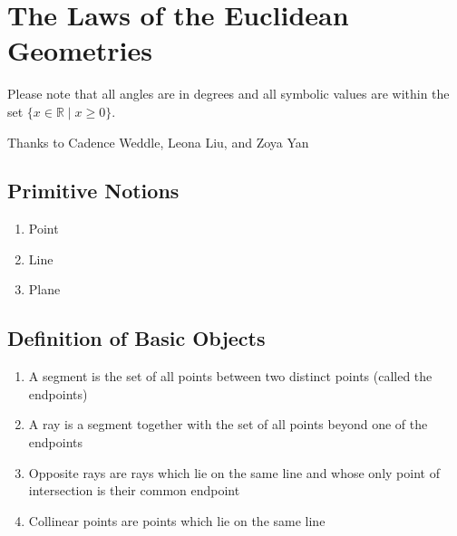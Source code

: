 \chapter{The Laws of the Euclidean Geometries}
Please note that all angles are in degrees and all symbolic values are within the set $\{x\in\mathbb{R} \mid x\geq0\}$.

Thanks to Cadence Weddle, Leona Liu, and Zoya Yan
\section*{Primitive Notions}
\begin{enumerate}
    \item Point
    \item Line
    \item Plane
\end{enumerate}

\section*{Definition of Basic Objects}
\begin{enumerate}
     \item A segment is the set of all points between two distinct points (called the endpoints)
     \item A ray is a segment together with the set of all points beyond one of the endpoints
     \item Opposite rays are rays which lie on the same line and whose only point of intersection is their common endpoint
     \item Collinear points are points which lie on the same line\end{enumerate}

